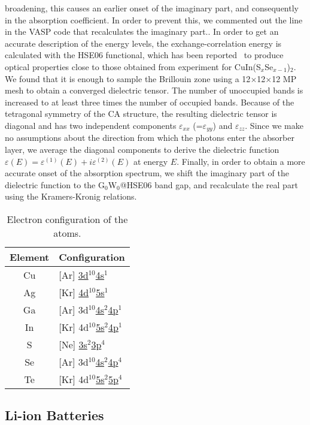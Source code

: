 \begin{refsection}
{broadening, this causes an earlier onset of the imaginary part, and 
consequently in the absorption coefficient. In order to prevent this, we 
commented out the line in the VASP code that recalculates the imaginary 
part.}. In order to get an accurate description of the energy levels, the 
exchange-correlation energy is calculated with the HSE06 functional, which has 
been reported~\cite{Wan2013} to produce optical properties close to those 
obtained from experiment for CuIn(S$_x$Se$_{x-1}$)$_2$. We found that it is 
enough to sample the Brillouin zone using a 12$\times$12$\times$12 MP mesh to 
obtain a converged dielectric tensor. The number of unoccupied bands is 
increased to at least three times the number of occupied bands. Because of the 
tetragonal symmetry of the CA structure, the resulting dielectric tensor is 
diagonal and has two independent components $\varepsilon_{xx}$ 
(=$\varepsilon_{yy}$) and $\varepsilon_{zz}$. Since we make no assumptions 
about the direction from which the photons enter the absorber layer, we 
average the diagonal components to derive the dielectric function $\varepsilon 
(E) = \varepsilon^{(1)} (E) + i \varepsilon^{(2)} (E) $ at energy $E$. 
Finally, in order to obtain a more accurate onset of the absorption spectrum, 
we shift the imaginary part of the dielectric function to the G$_0$W$_0$@HSE06 
band gap, and recalculate the real part using the Kramers-Kronig relations.  
 
\begin{table}[htbp] 
\centering 
\setlength{\captionmargin}{20pt} 
\renewcommand{\arraystretch}{1.2} 
\caption{\label{tab:valElec}Electron configuration of the atoms.} 
\begin{tabular}{c@{\hskip 2 em}l}\hline 
Element & Configuration \\\hline 
Cu & [Ar] \underline{3d$^{10}$4s$^1$} \\ 
Ag &[Kr] \underline{4d$^{10}$5s$^1$} \\ 
Ga &[Ar] 3d$^{10}$\underline{4s$^2$4p$^1$}\\ 
In &[Kr] 4d$^{10}$\underline{5s$^{2}$4p$^1$} \\ 
S &[Ne] \underline{3s$^2$3p$^4$} \\ 
Se &[Ar]  3d$^{10}$\underline{4s$^{2}$4p$^4$} \\ 
Te &[Kr] 4d$^{10}$\underline{5s$^2$5p$^4$}\\ 
\hline 
\end{tabular} 
\end{table} 
 
\subsection{Li-ion Batteries} 
 

\end{refsection}
